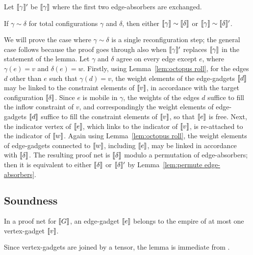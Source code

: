 \documentclass[conference,onecolumn]{IEEEtran}
\begin{document}
Let $\llbracket\gamma\rrbracket'$ be $\llbracket\gamma\rrbracket$ where the first two edge-absorbers are exchanged.

\begin{lemma}
If $\gamma\sim\delta$ for total configurations $\gamma$ and $\delta$, then either $\llbracket\gamma\rrbracket\sim\llbracket\delta\rrbracket$ or $\llbracket\gamma\rrbracket\sim\llbracket\delta\rrbracket'$.
\end{lemma}

\begin{IEEEproof}
We will prove the case where $\gamma\sim\delta$ is a single reconfiguration step; the general case follows because the proof goes through also when $\llbracket\gamma\rrbracket'$ replaces $\llbracket\gamma\rrbracket$ in the statement of the lemma.
%
Let $\gamma$ and $\delta$ agree on every edge except $e$, where $\gamma(e)=v$ and $\delta(e)=w$.
%
Firstly, using Lemma~\ref{lem:octopus roll}, for the edges $d$ other than $e$ such that $\gamma(d)=v$, the weight elements of the edge-gadgets $\llbracket d\rrbracket$ may be linked to the constraint elements of $\llbracket v\rrbracket$, in accordance with the target configuration $\llbracket\delta\rrbracket$.
%
Since $e$ is mobile in $\gamma$, the weights of the edges $d$ suffice to fill the inflow constraint of $v$, and correspondingly the weight elements of edge-gadgets $\llbracket d\rrbracket$ suffice to fill the constraint elements of $\llbracket v\rrbracket$, so that $\llbracket e\rrbracket$ is free.
%
Next, the indicator vertex of $\llbracket e\rrbracket$, which links to the indicator of $\llbracket v\rrbracket$, is re-attached to the indicator of $\llbracket w\rrbracket$.
%
Again using Lemma~\ref{lem:octopus roll}, the weight elements of edge-gadgets connected to $\llbracket w\rrbracket$, including $\llbracket e\rrbracket$, may be linked in accordance with $\llbracket\delta\rrbracket$.
%
The resulting proof net is $\llbracket\delta\rrbracket$ modulo a permutation of edge-absorbers; then it is equivalent to either $\llbracket\delta\rrbracket$ or $\llbracket\delta\rrbracket'$ by Lemma~\ref{lem:permute edge-absorbers}.
\end{IEEEproof}



\subsection*{Soundness}


\begin{lemma}
In a proof net for $\llbracket G\rrbracket$, an edge-gadget $\llbracket e\rrbracket$ belongs to the empire of at most one vertex-gadget $\llbracket v\rrbracket$.
\end{lemma}

\begin{IEEEproof}
Since vertex-gadgets are joined by a tensor, the lemma is immediate from \cite[Proposition 1]{Bellin-vandeWiele-1995}.
\end{IEEEproof}
\end{document}
